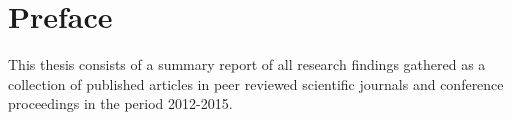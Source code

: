 \chapter*{Preface}

This thesis consists of a summary report of all research findings gathered as a collection of published articles in peer reviewed scientific journals and conference proceedings in the period 2012-2015.

\vfill
\signature{Kongens Lyngby, \titlepagedate{}\\
Remus Mihail Prunescu}
